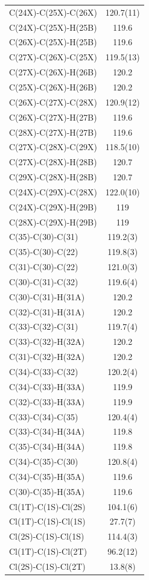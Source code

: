 \begin{center}
{\begin{supertabular}{p{1.5in}c}
C(24X)-C(25X)-C(26X)&120.7(11)\\
C(24X)-C(25X)-H(25B)&119.6\\
C(26X)-C(25X)-H(25B)&119.6\\
C(27X)-C(26X)-C(25X)&119.5(13)\\
C(27X)-C(26X)-H(26B)&120.2\\
C(25X)-C(26X)-H(26B)&120.2\\
C(26X)-C(27X)-C(28X)&120.9(12)\\
C(26X)-C(27X)-H(27B)&119.6\\
C(28X)-C(27X)-H(27B)&119.6\\
C(27X)-C(28X)-C(29X)&118.5(10)\\
C(27X)-C(28X)-H(28B)&120.7\\
C(29X)-C(28X)-H(28B)&120.7\\
C(24X)-C(29X)-C(28X)&122.0(10)\\
C(24X)-C(29X)-H(29B)&119\\
C(28X)-C(29X)-H(29B)&119\\
C(35)-C(30)-C(31)&119.2(3)\\
C(35)-C(30)-C(22)&119.8(3)\\
C(31)-C(30)-C(22)&121.0(3)\\
C(30)-C(31)-C(32)&119.6(4)\\
C(30)-C(31)-H(31A)&120.2\\
C(32)-C(31)-H(31A)&120.2\\
C(33)-C(32)-C(31)&119.7(4)\\
C(33)-C(32)-H(32A)&120.2\\
C(31)-C(32)-H(32A)&120.2\\
C(34)-C(33)-C(32)&120.2(4)\\
C(34)-C(33)-H(33A)&119.9\\
C(32)-C(33)-H(33A)&119.9\\
C(33)-C(34)-C(35)&120.4(4)\\
C(33)-C(34)-H(34A)&119.8\\
C(35)-C(34)-H(34A)&119.8\\
C(34)-C(35)-C(30)&120.8(4)\\
C(34)-C(35)-H(35A)&119.6\\
C(30)-C(35)-H(35A)&119.6\\
Cl(1T)-C(1S)-Cl(2S)&104.1(6)\\
Cl(1T)-C(1S)-Cl(1S)&27.7(7)\\
Cl(2S)-C(1S)-Cl(1S)&114.4(3)\\
Cl(1T)-C(1S)-Cl(2T)&96.2(12)\\
Cl(2S)-C(1S)-Cl(2T)&13.8(8)\\

\end{supertabular}}
\end{center}
